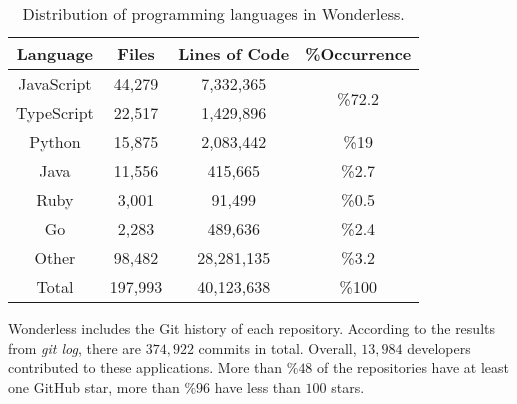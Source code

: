 \vspace{-2mm}
\begin{table}[h]
	\begin{center}
		\caption{Distribution of programming languages in Wonderless.}
		\label{tab:pl}
		\begin{tabular}{c|c|c|c}
			\textbf{Language} & \textbf{Files} & \textbf{Lines of Code} & \textbf{\%Occurrence} \\
			\toprule
			JavaScript &  44,279 & 7,332,365 & \multirow{2}{*}{\%72.2} \\
			TypeScript & 22,517 & 1,429,896 &  \\ \midrule
			Python & 15,875 & 2,083,442 & \%19 \\ \midrule
			Java & 11,556 & 415,665 & \%2.7  \\ \midrule
			Ruby & 3,001 & 91,499 & \%0.5  \\ \midrule
			Go & 2,283 & 489,636 & \%2.4 \\ \midrule
			Other & 98,482 & 28,281,135 & \%3.2 \\ \midrule
			Total & 197,993 & 40,123,638 & \%100\\ \midrule
		\end{tabular}
	\end{center}
\end{table}
\vspace{-5mm}

Wonderless includes the Git history of each repository. 
According to the results from \emph{git log}, there are $374,922$ commits in total. 
Overall, $13,984$ developers contributed to these applications.
More than $\%48$ of the repositories have at least one 
GitHub star, more than $\%96$ have less than $100$ stars.



